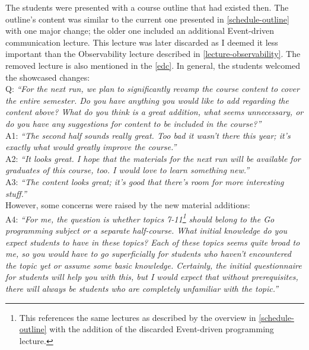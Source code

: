 \documentclass[
  digital,
  color,
  oneside,
  nosansbold,
  nocolorbold,
  nolof,
  nolot,
]{fithesis4}
\begin{document}
\noindent
The students were presented with a course outline that had existed then. The outline's content was similar to the current one presented in \cref{schedule-outline} with one major change; the older one included an additional Event-driven communication lecture. This lecture was later discarded as I deemed it less important than the Observability lecture described in \cref{lecture-observability}. The removed lecture is also mentioned in the \cref{edc}. In general, the students welcomed the showcased changes: \\

\noindent
Q: \textit{\enquote{For the next run, we plan to significantly revamp the course content to cover the entire semester. Do you have anything you would like to add regarding the content above? What do you think is a great addition, what seems unnecessary, or do you have any suggestions for content to be included in the course?}} \\

\noindent
A1: \textit{\enquote{The second half sounds really great. Too bad it wasn't there this year; it's exactly what would greatly improve the course.}} \\

\noindent
A2: \textit{\enquote{It looks great. I hope that the materials for the next run will be available for graduates of this course, too. I would love to learn something new.}} \\

\noindent
A3: \textit{\enquote{The content looks great; it's good that there's room for more interesting stuff.}} \\

\noindent
However, some concerns were raised by the new material additions: \\

\noindent
A4: \textit{\enquote{For me, the question is whether topics 7-11\footnote{This references the same lectures as described by the overview in \cref{schedule-outline} with the addition of the discarded Event-driven programming lecture.} should belong to the Go programming subject or a separate half-course. What initial knowledge do you expect students to have in these topics? Each of these topics seems quite broad to me, so you would have to go superficially for students who haven't encountered the topic yet or assume some basic knowledge. Certainly, the initial questionnaire for students will help you with this, but I would expect that without prerequisites, there will always be students who are completely unfamiliar with the topic.}} \\
\end{document}
